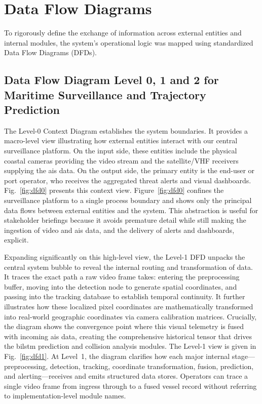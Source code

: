 \section{Data Flow Diagrams}

To rigorously define the exchange of information across external entities and internal modules, the system's operational logic was mapped using standardized Data Flow Diagrams (DFDs).

\subsection{Data Flow Diagram Level 0, 1 and 2 for Maritime Surveillance and Trajectory Prediction}
\begin{reportfigblock}
The Level-0 Context Diagram establishes the system boundaries. It provides a macro-level view illustrating how external entities interact with our central surveillance platform. On the input side, these entities include the physical coastal cameras providing the video stream and the satellite/VHF receivers supplying the \gls{ais} data. On the output side, the primary entity is the end-user or port operator, who receives the aggregated threat alerts and visual dashboards. Fig.~\ref{fig:dfd0} presents this context view.
Figure~\ref{fig:dfd0} confines the surveillance platform to a single process boundary and shows only the principal data flows between external entities and the system. This abstraction is useful for stakeholder briefings because it avoids premature detail while still making the ingestion of video and \gls{ais} data, and the delivery of alerts and dashboards, explicit.
\end{reportfigblock}

\begin{reportfigblock}
Expanding significantly on this high-level view, the Level-1 DFD unpacks the central system bubble to reveal the internal routing and transformation of data. It traces the exact path a raw video frame takes: entering the preprocessing buffer, moving into the detection node to generate spatial coordinates, and passing into the tracking database to establish temporal continuity. It further illustrates how these localized pixel coordinates are mathematically transformed into real-world geographic coordinates via camera calibration matrices. Crucially, the diagram shows the convergence point where this visual telemetry is fused with incoming \gls{ais} data, creating the comprehensive historical tensor that drives the \gls{bilstm} prediction and collision analysis modules. The Level-1 view is given in Fig.~\ref{fig:dfd1}.
At Level~1, the diagram clarifies how each major internal stage---preprocessing, detection, tracking, coordinate transformation, fusion, prediction, and alerting---receives and emits structured data stores. Operators can trace a single video frame from ingress through to a fused vessel record without referring to implementation-level module names.
\end{reportfigblock}


